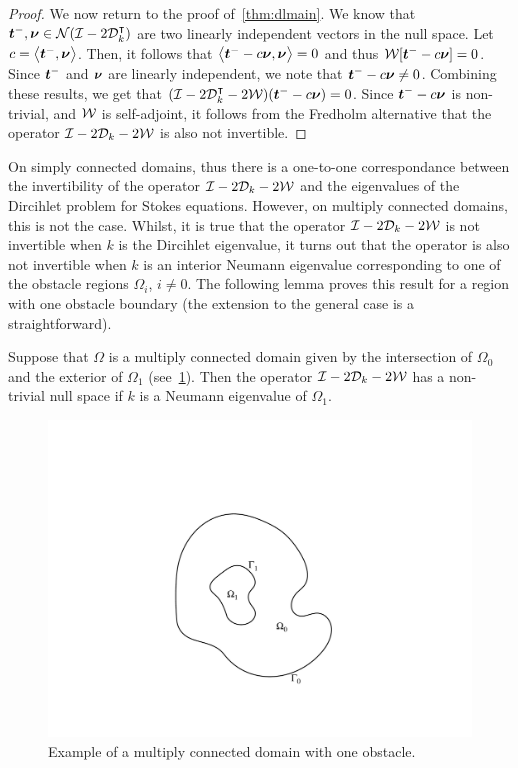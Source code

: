 \begin{proof}
We now return to the proof of~\cref{thm:dlmain}. 
We know that ${\boldsymbol t}^{-}, {\boldsymbol \nu} \in {\mathcal N}(\mathcal I - 2{\mathcal D}^{\intercal}_{k})$ are two linearly independent
vectors in the null space.
Let $c = \left< {\boldsymbol t}^{-},{\boldsymbol \nu} \right>$. Then, it follows that 
$\left<{\boldsymbol t}^{-} -c {\boldsymbol \nu}, {\boldsymbol \nu} \right> = 0$ and thus
${\mathcal W}[{\boldsymbol t}^{-} - c{\boldsymbol \nu}] = 0$. 
Since ${\boldsymbol t}^{-}$ and ${\boldsymbol \nu}$ are linearly independent, we note that
${\boldsymbol t}^{-} -c{\boldsymbol \nu} \neq 0$.
Combining these results, we get that
$(\mathcal I - 2{\mathcal D}^{\intercal}_{k} - 2{\mathcal W}) ({\boldsymbol t}^{-} - c{\boldsymbol \nu}) = 0$. 
Since ${\boldsymbol t}^{-}-c{\boldsymbol \nu}$ is non-trivial, and ${\mathcal W}$ is self-adjoint, 
it follows from the Fredholm alternative
that the operator $\mathcal I - 2{\mathcal D}_{k} - 2{\mathcal W}$ is also not invertible.
\end{proof}

On simply connected domains, thus there is a one-to-one correspondance
between the invertibility of the operator $\mathcal I - 2{\mathcal D}_{k} - 2{\mathcal W}$ 
and the eigenvalues of the Dircihlet problem for Stokes equations. 
However, on multiply connected domains, this is not the case.
Whilst, it is true that the operator $\mathcal I -2{\mathcal D}_{k} -2{\mathcal W}$ 
is not invertible when $k$ is the Dircihlet eigenvalue, it turns
out that the operator is also not invertible when $k$ is 
an interior Neumann eigenvalue corresponding to one of the obstacle
regions $\Omega_{i}$, $i\neq 0$.
The following lemma proves this result for a region with one obstacle
boundary (the extension to the general case is a straightforward).

\begin{lemma}
Suppose that $\Omega$ is a multiply connected domain given by the 
intersection of $\Omega_{0}$ and the exterior of $\Omega_{1}$
(see~\cref{fig:1ply}). 
Then the operator $\mathcal I - 2{\mathcal D}_{k} - 2{\mathcal W}$ has a non-trivial
null space if $k$ is a Neumann eigenvalue of $\Omega_{1}$.
\end{lemma}

\begin{figure}
\begin{center}
\includegraphics[width=0.3\linewidth]{media/multiply_final}
\end{center}
\caption{Example of a multiply connected domain with one obstacle.}
\label{fig:1ply}
\end{figure}

